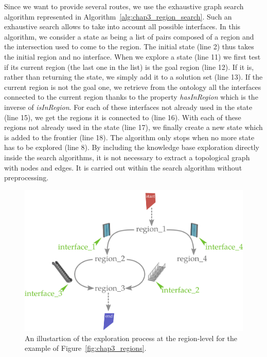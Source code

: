 Since we want to provide several routes, we use the exhaustive graph search algorithm represented in Algorithm~\ref{alg:chap3_region_search}. Such an exhaustive search allows to take into account all possible interfaces. In this algorithm, we consider a state as being a list of pairs composed of a region and the intersection used to come to the region. The initial state (line 2) thus takes the initial region and no interface. When we explore a state (line 11) we first test if its current region (the last one in the list) is the goal region (line 12). If it is, rather than returning the state, we simply add it to a solution set (line 13). If the current region is not the goal one, we retrieve from the ontology all the interfaces connected to the current region thanks to the property \textit{hasInRegion} which is the inverse of \textit{isInRegion}. For each of these interfaces not already used in the state (line 15), we get the regions it is connected to (line 16). With each of these regions not already used in the state (line 17), we finally create a new state which is added to the frontier (line 18). The algorithm only stops when no more state has to be explored (line 8). By including the knowledge base exploration directly inside the search algorithms, it is not necessary to extract a topological graph with nodes and edges. It is carried out within the search algorithm without preprocessing.

\begin{figure}[ht!]
\centering
\includegraphics[scale=0.12]{figures/chapter3/Region_exploration_graph.png}
\caption{\label{fig:chap3_region_expl} An illustartion of the exploration process at the region-level for the example of Figure~\ref{fig:chap3_regions}.}
\end{figure}

